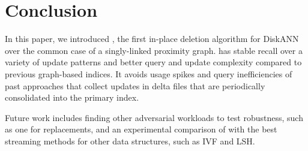 \section{Conclusion}
\label{sec:conclusion}

In this paper, we introduced \name, the first in-place deletion algorithm for DiskANN
over the common case of a singly-linked proximity graph. 
\name has stable recall over a variety of update patterns and better
query and update complexity compared to previous graph-based indices.
It avoids usage spikes and query inefficiencies of past approaches that
collect updates in delta files that are periodically consolidated into the primary index.

Future work includes finding other adversarial workloads to test robustness,
such as one for replacements, and an experimental comparison of \name with the
best streaming methods for other data structures, such as IVF and LSH.
